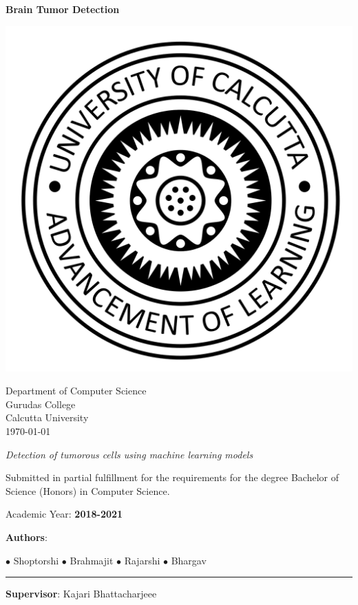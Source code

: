 \documentclass[12pt]{article}
\begin{document}
	\begin{titlepage}
		\begin{center}

			\vspace*{0.5cm}

			\Huge
			\textbf{Brain Tumor Detection}

			\vspace{0.8cm}

			\includegraphics[width=0.4\linewidth]{imgs/cu_logo.png}

			\vspace{1cm}

			\normalsize
			Department of Computer Science\\
			Gurudas College\\
			Calcutta University\\
			\today

			\vspace{0.5cm}
			\textit{Detection of tumorous cells using machine learning models}

			\vspace{1cm}

			\normalsize
			Submitted in partial fulfillment for the requirements for the
			degree Bachelor of Science (Honors) in Computer Science.

			Academic Year: \textbf{2018-2021}

			\vfill
			\textbf{Authors}:

			$\bullet$ Shoptorshi \space\space
			$\bullet$ Brahmajit \space\space
			$\bullet$ Rajarshi \space\space
			$\bullet$ Bhargav

			\vspace{1cm}
			\rule{5cm}{0.4pt}

			\textbf{Supervisor}: Kajari Bhattacharjeee

		\end{center}
	\end{titlepage}
\end{document}
